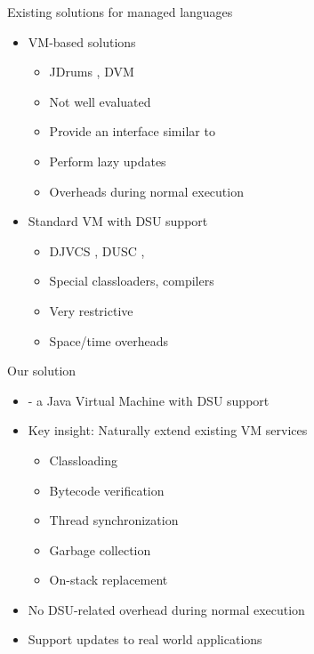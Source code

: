 \begin{frame}{Existing solutions for managed languages}%
\begin{itemize}
\item VM-based solutions
  \begin{itemize}
  \item JDrums \cite{ritzau00dynamic}, DVM \cite{Mala00a}
  \item Not well evaluated
  \item Provide an interface similar to \DSU{}
  \item Perform lazy updates
  \item Overheads during normal execution
  \end{itemize}
\item Standard VM with DSU support
  \begin{itemize}
  \item DJVCS \cite{BarrE03}, DUSC \cite{orso:java}, \cite{Milazzo05updates}
  \item Special classloaders, compilers
  \item Very restrictive
  \item Space/time overheads
  \end{itemize}
\end{itemize}

\end{frame}


\begin{frame}{Our solution}%
\begin{itemize}
\item \DSU{} - a Java Virtual Machine with DSU support
\item Key insight: Naturally extend existing VM services
  \begin{itemize}
  \item Classloading
  \item Bytecode verification
  \item Thread synchronization
  \item Garbage collection
  \item On-stack replacement
  \end{itemize}
\item No DSU-related overhead during normal execution
\item Support updates to real world applications
\end{itemize}
\end{frame}

